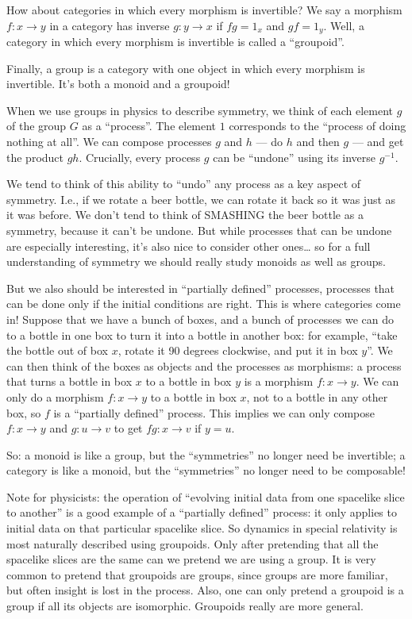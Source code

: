 \documentclass{article}
\begin{document}
How about categories in which every morphism is invertible? We say a
morphism \(f\colon x\to y\) in a category has inverse \(g\colon y\to x\)
if \(fg = 1_x\) and \(gf = 1_y\). Well, a category in which every
morphism is invertible is called a ``groupoid''.

Finally, a group is a category with one object in which every morphism
is invertible. It's both a monoid and a groupoid!

When we use groups in physics to describe symmetry, we think of each
element \(g\) of the group \(G\) as a ``process''. The element \(1\)
corresponds to the ``process of doing nothing at all''. We can compose
processes \(g\) and \(h\) --- do \(h\) and then \(g\) --- and get the
product \(gh\). Crucially, every process \(g\) can be ``undone'' using
its inverse \(g^{-1}\).

We tend to think of this ability to ``undo'' any process as a key aspect
of symmetry. I.e., if we rotate a beer bottle, we can rotate it back so
it was just as it was before. We don't tend to think of SMASHING the
beer bottle as a symmetry, because it can't be undone. But while
processes that can be undone are especially interesting, it's also nice
to consider other ones\ldots{} so for a full understanding of symmetry
we should really study monoids as well as groups.

But we also should be interested in ``partially defined'' processes,
processes that can be done only if the initial conditions are right.
This is where categories come in! Suppose that we have a bunch of boxes,
and a bunch of processes we can do to a bottle in one box to turn it
into a bottle in another box: for example, ``take the bottle out of box
\(x\), rotate it 90 degrees clockwise, and put it in box \(y\)''. We can
then think of the boxes as objects and the processes as morphisms: a
process that turns a bottle in box \(x\) to a bottle in box \(y\) is a
morphism \(f\colon x\to y\). We can only do a morphism
\(f\colon x\to y\) to a bottle in box \(x\), not to a bottle in any
other box, so \(f\) is a ``partially defined'' process. This implies we
can only compose \(f\colon x\to y\) and \(g\colon u \to v\) to get
\(fg\colon x \to v\) if \(y = u\).

So: a monoid is like a group, but the ``symmetries'' no longer need be
invertible; a category is like a monoid, but the ``symmetries'' no
longer need to be composable!

Note for physicists: the operation of ``evolving initial data from one
spacelike slice to another'' is a good example of a ``partially
defined'' process: it only applies to initial data on that particular
spacelike slice. So dynamics in special relativity is most naturally
described using groupoids. Only after pretending that all the spacelike
slices are the same can we pretend we are using a group. It is very
common to pretend that groupoids are groups, since groups are more
familiar, but often insight is lost in the process. Also, one can only
pretend a groupoid is a group if all its objects are isomorphic.
Groupoids really are more general.
\end{document}
